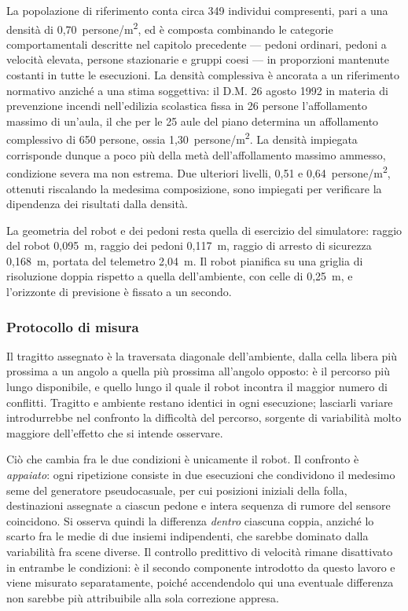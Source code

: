 La popolazione di riferimento conta circa 349 individui compresenti, pari a una densità di
0,70~persone/m\textsuperscript{2}, ed è composta combinando le categorie comportamentali
descritte nel capitolo precedente --- pedoni ordinari, pedoni a velocità elevata, persone
stazionarie e gruppi coesi --- in proporzioni mantenute costanti in tutte le esecuzioni.
La densità complessiva è ancorata a un riferimento normativo anziché a una stima
soggettiva: il D.M. 26 agosto 1992 in materia di prevenzione incendi nell'edilizia
scolastica fissa in 26 persone l'affollamento massimo di un'aula, il che per le 25 aule del
piano determina un affollamento complessivo di 650 persone, ossia
1,30~persone/m\textsuperscript{2}. La densità impiegata corrisponde dunque a poco più
della metà dell'affollamento massimo ammesso, condizione severa ma non estrema. Due
ulteriori livelli, 0,51 e 0,64~persone/m\textsuperscript{2}, ottenuti riscalando la
medesima composizione, sono impiegati per verificare la dipendenza dei risultati dalla
densità.

La geometria del robot e dei pedoni resta quella di esercizio del simulatore: raggio del
robot 0,095~m, raggio dei pedoni 0,117~m, raggio di arresto di sicurezza 0,168~m, portata
del telemetro 2,04~m. Il robot pianifica su una griglia di risoluzione doppia rispetto a
quella dell'ambiente, con celle di 0,25~m, e l'orizzonte di previsione è fissato a un
secondo.


\subsubsection{Protocollo di misura}

Il tragitto assegnato è la traversata diagonale dell'ambiente, dalla cella libera più
prossima a un angolo a quella più prossima all'angolo opposto: è il percorso più lungo
disponibile, e quello lungo il quale il robot incontra il maggior numero di conflitti.
Tragitto e ambiente restano identici in ogni esecuzione; lasciarli variare introdurrebbe
nel confronto la difficoltà del percorso, sorgente di variabilità molto maggiore
dell'effetto che si intende osservare.

Ciò che cambia fra le due condizioni è unicamente il robot. Il confronto è
\emph{appaiato}: ogni ripetizione consiste in due esecuzioni che condividono il medesimo
seme del generatore pseudocasuale, per cui posizioni iniziali della folla, destinazioni
assegnate a ciascun pedone e intera sequenza di rumore del sensore coincidono. Si osserva
quindi la differenza \emph{dentro} ciascuna coppia, anziché lo scarto fra le medie di due
insiemi indipendenti, che sarebbe dominato dalla variabilità fra scene diverse. Il
controllo predittivo di velocità rimane disattivato in entrambe le condizioni: è il
secondo componente introdotto da questo lavoro e viene misurato separatamente, poiché
accendendolo qui una eventuale differenza non sarebbe più attribuibile alla sola
correzione appresa.

